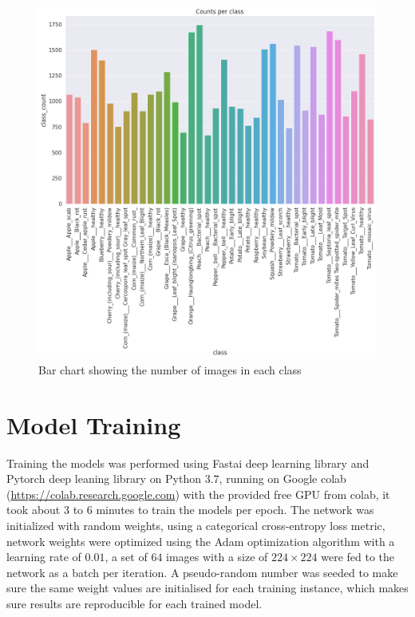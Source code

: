 \documentclass[12pt]{report}
\numberwithin{equation}{section}
\begin{document}
\begin{figure}[H]
\centering
\includegraphics[scale=0.3]{png/counts_per_class.png}
\caption{Bar chart showing the number of images in each class}
\label{fig:count}
\end{figure} 

\section{Model Training}
Training the models was performed using Fastai deep learning library \textbf{\cite{Howard_2020}} and Pytorch deep leaning library \textbf{\cite{NEURIPS2019_9015}} on Python $3.7$, running on Google colab (\url{https://colab.research.google.com}) with the provided free GPU from colab, it took about $3$ to $6$ minutes to train the models per epoch. The network was initialized with random weights, using a categorical cross-entropy loss metric, network weights were optimized using the Adam optimization algorithm with a learning rate of $0.01$, a set of $64$ images with a size of $224 \times 224$ were fed to the network as a batch per iteration. A pseudo-random number was seeded to make sure the same weight values are initialised for each training instance, which makes sure results are reproducible for each trained model.
\end{document}
